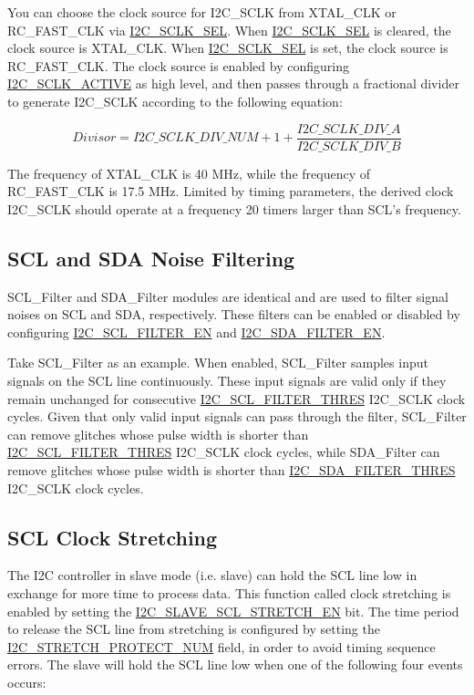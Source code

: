 \documentclass[main\_\_EN.tex]{subfiles}
\begin{document}
You can choose the clock source for I2C\_SCLK from XTAL\_CLK or RC\_FAST\_CLK via \hyperref[fielddesc:I2CSCLKSEL]{I2C\_SCLK\_SEL}. When \hyperref[fielddesc:I2CSCLKSEL]{I2C\_SCLK\_SEL} is cleared, the clock source is XTAL\_CLK. When \hyperref[fielddesc:I2CSCLKSEL]{I2C\_SCLK\_SEL} is set, the clock source is RC\_FAST\_CLK. The clock source is enabled by configuring \hyperref[fielddesc:I2CSCLKACTIVE]{I2C\_SCLK\_ACTIVE} as high level, and then passes through a fractional divider to generate I2C\_SCLK according to the following equation:

\[
Divisor = I2C\_SCLK\_DIV\_ NUM + 1+\frac{ \hyperref[fielddesc:I2CSCLKDIVA]{I2C\_SCLK\_DIV\_A}}{\hyperref[fielddesc:I2CSCLKDIVB]{I2C\_SCLK\_DIV\_B}}
\]

The frequency of XTAL\_CLK is 40 MHz, while the frequency of RC\_FAST\_CLK is 17.5 MHz. Limited by timing parameters, the derived clock I2C\_SCLK should operate at a frequency 20 timers larger than SCL's frequency.

\subsection{SCL and SDA Noise Filtering}
SCL\_Filter and SDA\_Filter modules are identical and are used to filter signal noises on SCL and SDA, respectively. These filters can be enabled or disabled by configuring \hyperref[fielddesc:I2CSCLFILTEREN]{I2C\_SCL\_FILTER\_EN} and \hyperref[fielddesc:I2CSDAFILTEREN]{I2C\_SDA\_FILTER\_EN}.

Take SCL\_Filter as an example. When enabled, SCL\_Filter samples input signals on the SCL line continuously. These input signals are valid only if they remain unchanged for consecutive \hyperref[fielddesc:I2CSCLFILTERTHRES]{I2C\_SCL\_FILTER\_THRES} I2C\_SCLK clock cycles. Given that only valid input signals can pass through the filter, SCL\_Filter can remove glitches whose pulse width is shorter than \hyperref[fielddesc:I2CSCLFILTERTHRES]{I2C\_SCL\_FILTER\_THRES} I2C\_SCLK clock cycles, while SDA\_Filter can remove glitches whose pulse width is shorter than \hyperref[fielddesc:I2CSDAFILTERTHRES]{I2C\_SDA\_FILTER\_THRES} I2C\_SCLK clock cycles.

\subsection{SCL Clock Stretching}
The I2C controller in slave mode (i.e. slave) can hold the SCL line low in exchange for more time to process data. This function called clock stretching is enabled by setting the \hyperref[fielddesc:I2CSLAVESCLSTRETCHEN]{I2C\_SLAVE\_SCL\_STRETCH\_EN} bit. The time period to release the SCL line from stretching is configured by setting the \hyperref[fielddesc:I2CSTRETCHPROTECTNUM]{I2C\_STRETCH\_PROTECT\_NUM} field, in order to avoid timing sequence errors.
The slave will hold the SCL line low when one of the following four events occurs:
\end{document}

